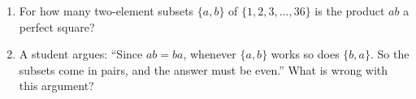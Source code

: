\begin{enumerate}
\item[(a)] For how many two-element subsets $\{a,b\}$ of $\{1,2,3,\dots,36\}$ is the product $ab$ a perfect square?
\item[(b)] A student argues: ``Since $ab=ba$, whenever $\{a,b\}$ works so does $\{b,a\}$. So the subsets come in pairs, and the answer must be even.'' What is wrong with this argument?
\end{enumerate}

